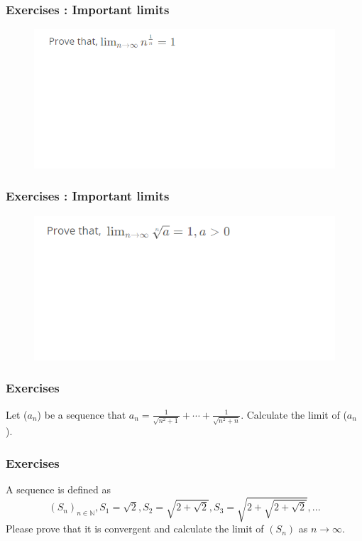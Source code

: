 \documentclass{beamer}
\begin{document}
\begin{frame}
    \frametitle{Exercises : Important limits}
    \begin{figure}[htbp]
        \centering
        \includegraphics[width=12cm]{limit2.png}
    \end{figure}
\end{frame}

\begin{frame}
    \frametitle{Exercises : Important limits}
    \begin{figure}[htbp]
        \centering
        \includegraphics[width=12cm]{limit3.png}
    \end{figure}
\end{frame}

\begin{frame}
    \frametitle{Exercises}
    Let ($a_n$) be a sequence that $a_n=\frac{1}{\sqrt{n^2+1}}+\cdots+\frac{1}{\sqrt{n^2+n}}$.
    Calculate the limit of ($a_n$).
\end{frame}

\begin{frame}
    \frametitle{Exercises}
    A sequence is defined as
    \begin{equation*}
        (S_n)_{n\in\mathbb{N}}, S_1=\sqrt{2}, S_2=\sqrt{2+\sqrt{2}}, S_3=\sqrt{2+\sqrt{2+\sqrt{2}}},...
    \end{equation*}
    Please prove that it is convergent and calculate the limit of $(S_n)$ as $n\rightarrow \infty$.
\end{frame}
\end{document}
